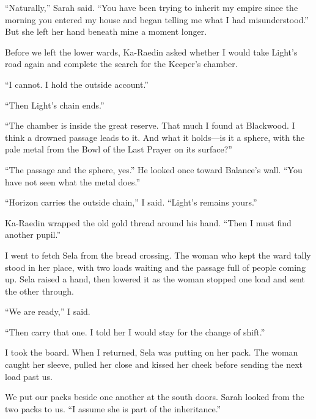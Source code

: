``Naturally,'' Sarah said. ``You have been trying to inherit my empire since the morning you entered my house and began telling me what I had misunderstood.'' But she left her hand beneath mine a moment longer.\par
\ornament

Before we left the lower wards, Ka-Raedin asked whether I would take Light's road again and complete the search for the Keeper's chamber.\par

``I cannot. I hold the outside account.''\par

``Then Light's chain ends.''\par

``The chamber is inside the great reserve. That much I found at Blackwood. I think a drowned passage leads to it. And what it holds---is it a sphere, with the pale metal from the Bowl of the Last Prayer on its surface?''\par

``The passage and the sphere, yes.'' He looked once toward Balance's wall. ``You have not seen what the metal does.''\par

``Horizon carries the outside chain,'' I said. ``Light's remains yours.''\par

Ka-Raedin wrapped the old gold thread around his hand. ``Then I must find another pupil.''\par

I went to fetch Sela from the bread crossing. The woman who kept the ward tally stood in her place, with two loads waiting and the passage full of people coming up. Sela raised a hand, then lowered it as the woman stopped one load and sent the other through.\par

``We are ready,'' I said.\par

``Then carry that one. I told her I would stay for the change of shift.''\par

I took the board. When I returned, Sela was putting on her pack. The woman caught her sleeve, pulled her close and kissed her cheek before sending the next load past us.\par

We put our packs beside one another at the south doors. Sarah looked from the two packs to us. ``I assume she is part of the inheritance.''\par

